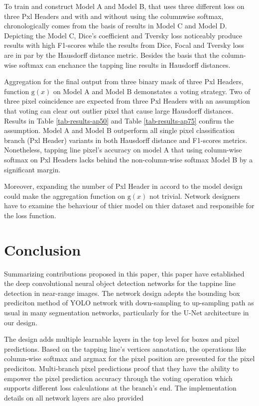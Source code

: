 \documentclass[default,pdflatex,iicol]{sn-jnl}%
\begin{document}
To train and construct Model A and Model B, that uses three different loss on three Pxl Headers and with and without using the columnwise softmax, chronologically comes from the basis of results in Model C and Model D. Depicting the Model C, Dice's coefficient and Tversky loss noticeably produce results with high F1-scores while the results from Dice, Focal and Tversky loss are in par by the Hausdorff distance metric. Besides the basis that the column-wise softmax can enchance the tapping line results in Hausdorff distances. 

Aggregation for the final output from three binary mask of three Pxl Headers, function $\mathrm{g}(x)$ on Model A and Model B demonstates a voting strategy. Two of three pixel coincidence are expected from three Pxl Headers with an assumption that voting can clear out outlier pixel that cause large Hausdorff distances. Results in Table \ref{tab-results-ap50} and Table \ref{tab-results-ap75} confirm the assumption. Model A and Model B outperform all single pixel classification branch (Pxl Header) variants in both Hausdorff distance and F1-scores metrics. Nonetheless, tapping line pixel's accuracy on model A that using column-wise softmax on Pxl Headers lacks behind the non-column-wise softmax Model B by a significant margin.

Moreover, expanding the number of Pxl Header in accord to the model design could make the aggregation function on $\mathrm{g}(x)$ not trivial. Network designers have to examine the behaviour of thier model on thier dataset and responsible for the loss function.

\section{Conclusion}\label{sec-conclude}
Summarizing contributions proposed in this paper, this paper have established the deep convolutional neural object detection networks for the tappine line detection in near-range images. The network design adepts the bounding box prediciton method of YOLO network with down-sampling to up-sampling path as usual in many segmentation networks, particularly for the U-Net architecture in our design. 

The design adds multiple learnable layers in the top level for boxes and pixel predictions. Based on the tapping line's vertices annotation, the operations like column-wise softmax and argmax for the pixel position are presented for the pixel prediciton. Multi-branch pixel predictions proof that they have the ability to empower the pixel prediction accuracy through the voting operation which supports different loss calculations at the branch's end. The implementation details on all network layers are also provided
\end{document}

